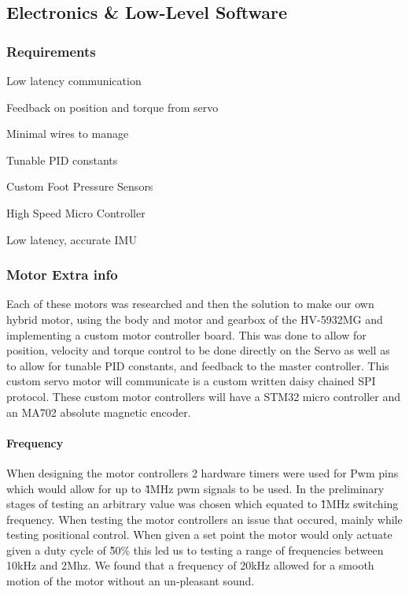 


    \subsection{Electronics \& Low-Level Software}
        \subsubsection{Requirements}
            \begin{Deliverables} %
                \item Low latency communication
                \item Feedback on position and torque from servo
                \item Minimal wires to manage
                \item Tunable PID constants
                \item Custom Foot Pressure Sensors
                \item High Speed Micro Controller
                \item Low latency, accurate IMU
            \end{Deliverables}

        \subsubsection{Motor Extra info}
        Each of these motors was researched and then the solution to make our own hybrid motor, using the body and motor and gearbox of the HV-5932MG and implementing a custom motor controller board. This was done to allow for position, velocity and torque control to be done directly on the Servo as well as to allow for tunable PID constants, and feedback to the master controller. This custom servo motor will communicate is a custom written daisy chained SPI protocol. These custom motor controllers will have a STM32 micro controller and an MA702 absolute magnetic encoder\cite{MA702}.
        \paragraph{Frequency}
        When designing the motor controllers 2 hardware timers were used for Pwm pins which would allow for up to \~4MHz pwm signals to be used. In the preliminary stages of testing an arbitrary value was chosen which equated to \~1MHz switching frequency. When testing the motor controllers an issue that occured, mainly while testing positional control. When given a set point the motor would only actuate given a duty cycle of  \~50\% this led us to testing a range of frequencies between 10kHz and 2Mhz. We found that a frequency of 20kHz allowed for a smooth motion of the motor without an un-pleasant sound.  
